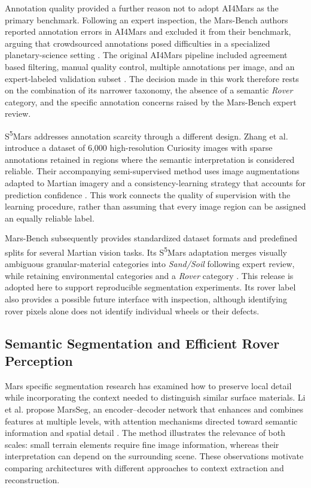 Annotation quality provided a further reason not to adopt AI4Mars as the primary benchmark. Following an expert inspection, the Mars-Bench authors reported annotation errors in AI4Mars and excluded it from their benchmark, arguing that crowdsourced annotations posed difficulties in a specialized planetary-science setting \cite{purohit2025marsbench}. The original AI4Mars pipeline included agreement based filtering, manual quality control, multiple annotations per image, and an expert-labeled validation subset \cite{swan2021ai4mars}. The decision made in this work therefore rests on the combination of its narrower taxonomy, the absence of a semantic \emph{Rover} category, and the specific annotation concerns raised by the Mars-Bench expert review.

S\textsuperscript{5}Mars addresses annotation scarcity through a different design. Zhang et al. introduce a dataset of 6,000 high-resolution Curiosity images with sparse annotations retained in regions where the semantic interpretation is considered reliable. Their accompanying semi-supervised method uses image augmentations adapted to Martian imagery and a consistency-learning strategy that accounts for prediction confidence \cite{zhang2024s5mars}. This work connects the quality of supervision with the learning procedure, rather than assuming that every image region can be assigned an equally reliable label.

Mars-Bench subsequently provides standardized dataset formats and predefined splits for several Martian vision tasks. Its S\textsuperscript{5}Mars adaptation merges visually ambiguous granular-material categories into \emph{Sand/Soil} following expert review, while retaining environmental categories and a \emph{Rover} category \cite{purohit2025marsbench}. This release is adopted here to support reproducible segmentation experiments. Its rover label also provides a possible future interface with inspection, although identifying rover pixels alone does not identify individual wheels or their defects.

\subsection{Semantic Segmentation and Efficient Rover Perception}

Mars specific segmentation research has examined how to preserve local detail while incorporating the context needed to distinguish similar surface materials. Li et al. propose MarsSeg, an encoder--decoder network that enhances and combines features at multiple levels, with attention mechanisms directed toward semantic information and spatial detail \cite{li2025marsseg}. The method illustrates the relevance of both scales: small terrain elements require fine image information, whereas their interpretation can depend on the surrounding scene. These observations motivate comparing architectures with different approaches to context extraction and reconstruction.


